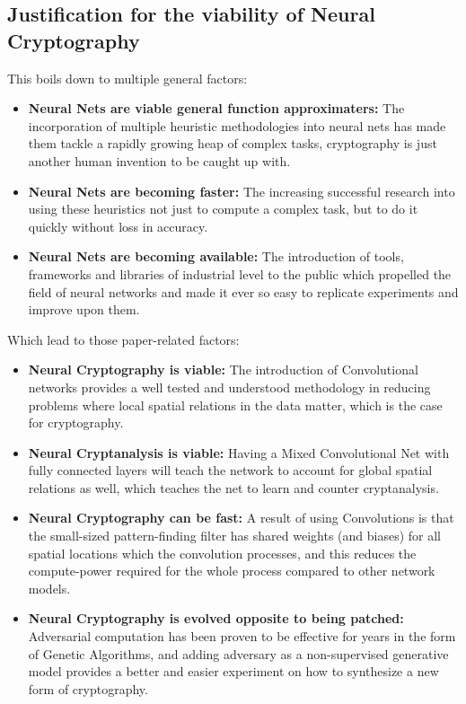 \documentclass[a4paper, 12pt]{report}
\begin{document}
\subsection{\textbf{Justification for the viability of Neural Cryptography}}
This boils down to multiple general factors:
\begin{itemize}[nosep]
	\item \textbf{Neural Nets are viable general function approximaters:} The incorporation of multiple heuristic methodologies into neural nets has made them tackle a rapidly growing heap of complex tasks, cryptography is just another human invention to be caught up with.
	\item \textbf{Neural Nets are becoming faster:} The increasing successful research into using these heuristics not just to compute a complex task, but to do it quickly without loss in accuracy.
	\item \textbf{Neural Nets are becoming available:} The introduction of tools, frameworks and libraries of industrial level to the public which propelled the field of neural networks and made it ever so easy to replicate experiments and improve upon them.
\end{itemize}
Which lead to those paper-related factors:
\begin{itemize}[nosep]
	\item \textbf{Neural Cryptography is viable:} The introduction of Convolutional networks provides a well tested and understood methodology in reducing problems where local spatial relations in the data matter, which is the case for cryptography.
	\item \textbf{Neural Cryptanalysis is viable:} Having a Mixed Convolutional Net with fully connected layers will teach the network to account for global spatial relations as well, which teaches the net to learn and counter cryptanalysis.
	\item \textbf{Neural Cryptography can be fast:} A result of using Convolutions is that the small-sized pattern-finding filter has shared weights (and biases) for all spatial locations which the convolution processes, and this reduces the compute-power required for the whole process compared to other network models.
	\item \textbf{Neural Cryptography is evolved opposite to being patched:} Adversarial computation has been proven to be effective for years in the form of Genetic Algorithms, and adding adversary as a non-supervised generative model provides a better and easier experiment on how to synthesize a new form of cryptography.
\end{itemize}
\newpage
\end{document}
